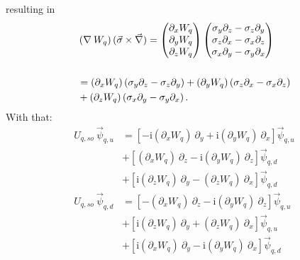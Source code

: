 \documentclass[4p]{elsarticle}
\begin{document}
\begin{itemize}
resulting in
\begin{align}
&\left( \nabla \:W_q \right) ( \vec{\sigma} \times  \vec{\nabla} ) =   \begin{pmatrix} \partial_x W_q \\ \partial_y W_q \\ \partial_z W_q \end{pmatrix}  \begin{pmatrix} \sigma_y \partial_z -\sigma_z \partial_y \\ \sigma_z \partial_x - \sigma_x \partial_z \\ \sigma_x \partial_y - \sigma_y \partial_x \end{pmatrix} \\
\newline \nonumber\\
&=  (\partial_x W_q) \left( \sigma_y \partial_z - \sigma_z \partial_y \right) + (\partial_y W_q) \left( \sigma_z \partial_x - \sigma_x \partial_z \right) \nonumber\\
&+  (\partial_z W_q) \left( \sigma_x \partial_y - \sigma_y \partial_x \right) .
\end{align}
With that:
\begin{align}
U_{q,so} \: \vec{\psi}_{q,u} & = \left[ - \mathrm{i} (\partial_x W_q) \: \partial_y + \mathrm{i} (\partial_y W_q) \: \partial_x \right] \vec{\psi}_{q,u} \nonumber\\
&+ \left[ (\partial_x W_q) \: \partial_z  - \mathrm{i} (\partial_y W_q) \: \partial_z \right] \vec{\psi}_{q,d} \nonumber\\
&+ \left[ \mathrm{i} (\partial_z W_q) \: \partial_y - (\partial_z W_q) \: \partial_x \right] \vec{\psi}_{q,d}  
\label{Uso1}\\
U_{q,so} \: \vec{\psi}_{q,d} & = \left[ - (\partial_x W_q) \: \partial_z - \mathrm{i} (\partial_y W_q) \: \partial_z \right] \vec{\psi}_{q,u} \nonumber\\
&+ \left[ \mathrm{i} (\partial_z W_q) \: \partial_y + (\partial_z W_q) \: \partial_x \right] \vec{\psi}_{q,u} \nonumber\\
&+ \left[ \mathrm{i} (\partial_x W_q) \: \partial_y - \mathrm{i} (\partial_y W_q) \: \partial_x \right] \vec{\psi}_{q,d}
\label{Uso2}
\end{align}
\end{itemize}
\end{document}
